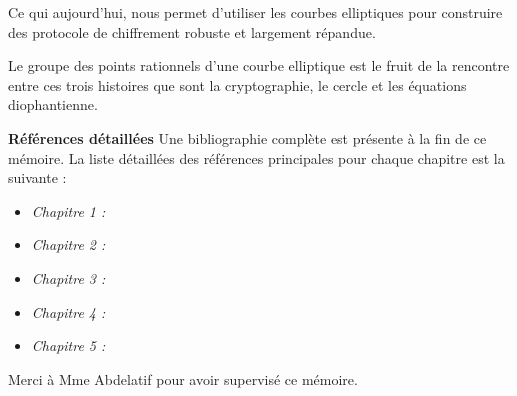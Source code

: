 Ce qui aujourd'hui, nous permet d'utiliser les courbes elliptiques pour construire des
protocole de chiffrement robuste et largement répandue.

Le groupe des points rationnels d'une courbe elliptique est le fruit de la rencontre entre ces trois
histoires que sont la cryptographie, le cercle et les équations diophantienne.

\begin{center}
    \textbf{Références détaillées}
    Une bibliographie complète est présente à la fin de ce mémoire. La liste détaillées des
    références principales pour chaque chapitre est la suivante :
    \begin{itemize}
        \item \textit{Chapitre 1 :}
        \item \textit{Chapitre 2 :}
        \item \textit{Chapitre 3 :}
        \item \textit{Chapitre 4 :}
        \item \textit{Chapitre 5 :}
    \end{itemize}
\end{center}

\begin{center}
    Merci à Mme Abdelatif pour avoir supervisé ce mémoire.
\end{center}








